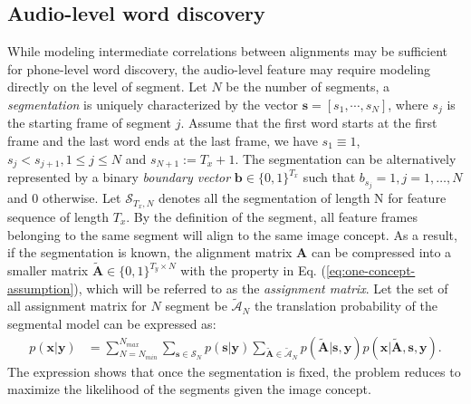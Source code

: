 \documentclass[journal]{IEEEtran}
\begin{document}
\subsection{Audio-level word discovery}
While modeling intermediate correlations between alignments may be sufficient for phone-level word discovery, the audio-level feature may require modeling directly on the level of segment. Let $N$ be the number of segments, a \textit{segmentation} is uniquely characterized by the vector $\mathbf s = [s_1, \cdots, s_N]$, where $s_j$ is the starting frame of segment $j$. Assume that the first word starts at the first frame and the last word ends at the last frame, we have $s_1 \equiv 1$, $s_j < s_{j+1}, 1\leq j \leq N$ and $s_{N+1} := T_x+1$. The segmentation can be alternatively represented by a binary \textit{boundary vector} $\mathbf b \in \{0, 1\}^{T_x}$ such that $b_{s_j}=1, j=1,\ldots,N$ and 0 otherwise. Let $\mathcal S_{T_x, N}$ denotes all the segmentation of length N for feature sequence of length $T_x$. By the definition of the segment, all feature frames belonging to the same segment will align to the same image concept. As a result, if the segmentation is known, the alignment matrix $\mathbf A$ can be compressed into a smaller matrix $\tilde{\mathbf{A}} \in \{0, 1\}^{T_y \times N}$ with the property in Eq. (\ref{eq:one-concept-assumption}), which will be referred to as the \textit{assignment matrix}. Let the set of all assignment matrix for $N$ segment be $\tilde{\mathcal A}_N$ the translation probability of the segmental model can be expressed as:
\begin{align}\label{eq:trans_prob_segmental}
    p(\mathbf x|\mathbf y) &= \sum_{N=N_{min}}^{N_{max}} \sum_{\mathbf s \in \mathcal S_N} p(\mathbf s|\mathbf y)\sum_{\tilde{\mathbf{A}} \in \tilde{\mathcal A}_N} p(\tilde{\mathbf{A}}| \mathbf s, \mathbf y) p(\mathbf x|\tilde{\mathbf A}, \mathbf s, \mathbf y).
\end{align}
The expression shows that once the segmentation is fixed, the problem reduces to maximize the likelihood of the segments given the image concept.
\end{document}
